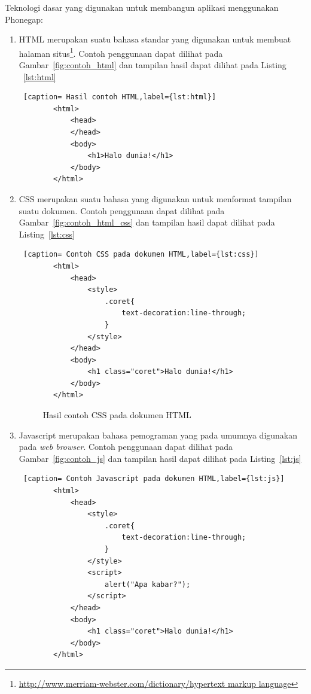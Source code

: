 Teknologi dasar yang digunakan untuk membangun aplikasi menggunakan Phonegap:
\begin{enumerate}
	\item HTML merupakan suatu bahasa standar yang digunakan untuk membuat halaman situs\footnote{\url{http://www.merriam-webster.com/dictionary/hypertext markup language}}. Contoh penggunaan dapat dilihat pada Gambar~\ref{fig:contoh_html} dan tampilan hasil dapat dilihat pada Listing ~\ref{lst:html}
	
	\begin{lstlisting} [caption= Hasil contoh HTML,label={lst:html}]
		<html>
			<head>
			</head>
			<body>
				<h1>Halo dunia!</h1>
			</body>
		</html>
	\end{lstlisting}
		
	\item CSS merupakan suatu bahasa yang digunakan untuk menformat tampilan suatu dokumen. Contoh penggunaan dapat dilihat pada Gambar~\ref{fig:contoh_html_css} dan tampilan hasil dapat dilihat pada Listing~\ref{lst:css}
	
	\begin{lstlisting} [caption= Contoh CSS pada dokumen HTML,label={lst:css}]
		<html>
			<head>
				<style>
					.coret{
						text-decoration:line-through;
					}
				</style>
			</head>
			<body>
				<h1 class="coret">Halo dunia!</h1>
			</body>
		</html>
	\end{lstlisting}
		
		\begin{figure}[h]
		\centering
		\caption[Hasil contoh CSS pada dokumen HTML]{Hasil contoh CSS pada dokumen HTML} 
		\label{fig:hasil_contoh_html_css}
		\end{figure}
		
	\item Javascript merupakan bahasa pemograman yang pada umumnya digunakan pada \textit{web browser}. Contoh penggunaan dapat dilihat pada Gambar~\ref{fig:contoh_js} dan tampilan hasil dapat dilihat pada Listing~\ref{lst:js}
	
	\begin{lstlisting} [caption= Contoh Javascript pada dokumen HTML,label={lst:js}]
		<html>
			<head>
				<style>
					.coret{
						text-decoration:line-through;
					}
				</style>
				<script>
					alert("Apa kabar?");
				</script>
			</head>
			<body>
				<h1 class="coret">Halo dunia!</h1>
			</body>
		</html>
	\end{lstlisting}
	
\end{enumerate}

